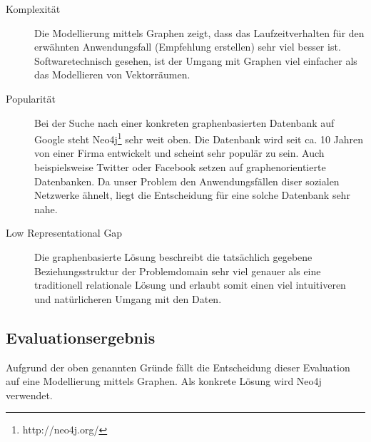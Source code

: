 \documentclass[10pt,a4paper]{scrartcl}
\begin{document}
\begin{description}
	\item[Komplexität] Die Modellierung mittels Graphen zeigt, dass das Laufzeitverhalten für den
		erwähnten Anwendungsfall (Empfehlung erstellen) sehr viel besser ist. Softwaretechnisch 
		gesehen, ist der Umgang mit Graphen viel einfacher als das Modellieren von Vektorräumen.
	\item[Popularität] Bei der Suche nach einer konkreten graphenbasierten Datenbank auf Google steht
		Neo4j\footnote{http://neo4j.org/} sehr weit oben. Die Datenbank wird seit ca. 10 Jahren von einer Firma
		entwickelt und scheint sehr populär zu sein. Auch beispielsweise Twitter oder Facebook setzen auf
		graphenorientierte Datenbanken. Da unser Problem den Anwendungsfällen diser sozialen Netzwerke
		ähnelt, liegt die Entscheidung für eine solche Datenbank sehr nahe.
	\item[Low Representational Gap] Die graphenbasierte Lösung beschreibt die
		tatsächlich gegebene Beziehungsstruktur der Problemdomain sehr viel genauer als eine
		traditionell relationale Lösung und erlaubt somit einen viel intuitiveren und natürlicheren
		Umgang mit den Daten.
\end{description}

\subsection{Evaluationsergebnis}

Aufgrund der oben genannten Gründe fällt die Entscheidung dieser Evaluation auf eine Modellierung
mittels Graphen. Als konkrete Lösung wird Neo4j verwendet.
\end{document}
